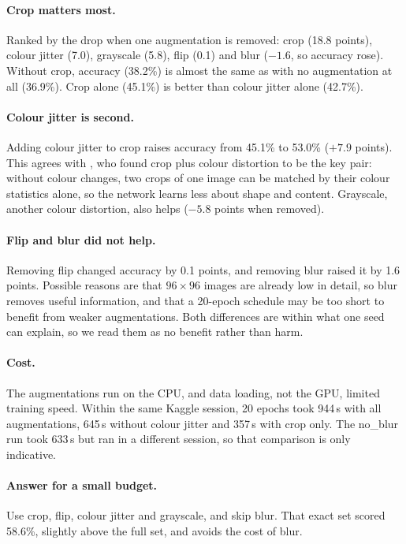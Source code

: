 \documentclass[11pt,a4paper]{article}
\begin{document}
\paragraph{Crop matters most.} Ranked by the drop when one augmentation is removed: crop (18.8 points), colour
jitter (7.0), grayscale (5.8), flip (0.1) and blur ($-1.6$, so accuracy rose). Without crop, accuracy (38.2\%)
is almost the same as with no augmentation at all (36.9\%). Crop alone (45.1\%) is better than colour jitter
alone (42.7\%).

\paragraph{Colour jitter is second.} Adding colour jitter to crop raises accuracy from 45.1\% to 53.0\%
($+7.9$ points). This agrees with \citet{chen2020}, who found crop plus colour distortion to be the key pair:
without colour changes, two crops of one image can be matched by their colour statistics alone, so the network
learns less about shape and content. Grayscale, another colour distortion, also helps ($-5.8$ points when
removed).

\paragraph{Flip and blur did not help.} Removing flip changed accuracy by 0.1 points, and removing blur raised
it by 1.6 points. Possible reasons are that $96\times96$ images are already low in detail, so blur removes
useful information, and that a 20-epoch schedule may be too short to benefit from weaker augmentations. Both
differences are within what one seed can explain, so we read them as no benefit rather than harm.

\paragraph{Cost.} The augmentations run on the CPU, and data loading, not the GPU, limited training speed.
Within the same Kaggle session, 20 epochs took 944\,s with all augmentations, 645\,s without colour jitter and
357\,s with crop only. The no\_blur run took 633\,s but ran in a different session, so that comparison is only
indicative.

\paragraph{Answer for a small budget.} Use crop, flip, colour jitter and grayscale, and skip blur. That exact
set scored 58.6\%, slightly above the full set, and avoids the cost of blur.
\end{document}
